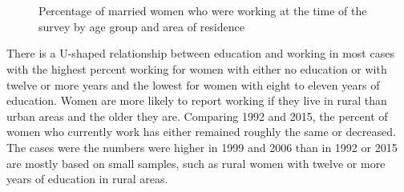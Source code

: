 \documentclass[12pt,letterpaper]{article}
\begin{document}
\begin{figure}[!htpb]
\centering
{}
\\
\\
\caption{Percentage of married women who were working at the time of the 
survey by age group and area of residence}
\label{fig:work_by_survey}
\end{figure}


There is a U-shaped relationship between education and working in most cases with 
the highest percent working for women with either no education or with twelve or 
more years and the lowest for women with eight to eleven years of education.
Women are more likely to report working if they live in rural than urban areas 
and the older they are.
Comparing 1992 and 2015, the percent of women who currently work has either 
remained roughly the same or decreased.
The cases were the numbers were higher in 1999 and 2006 than in 1992 or 2015 
are mostly based on small samples, such as rural women with twelve or more 
years of education in rural areas.
\end{document}
